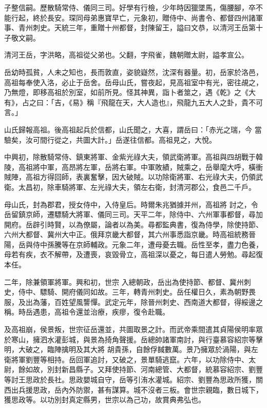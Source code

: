 \begin{pinyinscope}
 子整信嗣。歷散騎常侍、儀同三司。好學有行檢，少年時因獵墜馬，傷腰腳，卒不能行起，終於長安。琛同母弟惠寶早亡，元象初，贈侍中、尚書令、都督四州諸軍事、青州刺史。天統三年，重贈十州都督，封陳留王，謚曰文恭，以清河王岳第十子敬文嗣。



 清河王岳，字洪略，高祖從父弟也。父翻，字飛雀，魏朝贈太尉，謚孝宣公。



 岳幼時孤貧，人未之知也，長而敦直，姿貌嶷然，沈深有器量。初，岳家於洛邑，高祖每奉使入洛，必止于岳舍。岳母山氏，嘗夜起，見高祖室中有光，密往覘之，乃無燈，即移高祖於別室，如前所見。怪其神異，詣卜者筮之，遇《乾》之《大有》，占之曰：「吉，《易》稱『飛龍在天，大人造也』，飛龍九五大人之卦，貴不可言。」



 山氏歸報高祖。後高祖起兵於信都，山氏聞之，大喜，謂岳曰：「赤光之瑞，今
 當驗矣，汝可間行從之，共圖大計。」岳遂往信都。高祖見之，大悅。



 中興初，除散騎常侍、鎮東將軍、金紫光祿大夫，領武衛將軍。高祖與四胡戰于韓陵，高祖將中軍，高昂將左軍，岳將右軍。中軍敗績，賊乘之，岳舉麾大呼，橫衝賊陣，高祖方得回師，表裏奮擊，因大破賊。以功除衛將軍、右光祿大夫，仍領武衛。太昌初，除車騎將軍、左光祿大夫，領左右衛，封清河郡公，食邑二千戶。



 母山氏，封為郡君，授女侍中，入侍皇后。時爾朱兆猶據并州，高祖將
 討之，令岳留鎮京師，遷驃騎大將軍、儀同三司。天平二年，除侍中、六州軍事都督，尋加開府。岳辟引時賢，以為僚屬，論者以為美。尋都監典書，復為侍學，除使持節、六州大都督、冀州大中正。俄拜京畿大都督，其六州事悉詣京畿。時高祖統務晉陽，岳與侍中孫騰等在京師輔政。元象二年，遭母憂去職。岳性至孝，盡力色養，母若有疾，衣不解帶，及遭喪，哀毀骨立，高祖深以憂之，每日遣人勞勉。尋起復本任。



 二年，除兼領軍將軍。興和初，世宗
 入總朝政，岳出為使持節、都督、冀州刺史，侍中、驃騎、開府儀同如故。三年，轉青州刺史。岳任權日久，素為朝野畏服，及出為藩，百姓望風讋憚。武定元年，除晉州刺史、西南道大都督，得綏邊之稱。時岳遇患，高祖令還並治療，疾瘳，復令赴職。



 及高祖崩，侯景叛，世宗征岳還並，共圖取景之計。而武帝乘間遣其貞陽侯明率眾於寒山，擁泗水灌彭城，與景為掎角聲援。岳總帥諸軍南討，與行臺慕容紹宗等擊明，大破之，臨陣擒明及其大將
 胡貴孫，自餘俘馘數萬。景乃擁眾於渦陽，與左衛將軍劉豐等相持。岳回軍追討，又破之，景單騎逃竄。六年，以功除侍中、太尉，餘如故，別封新昌縣子。又拜使持節、河南總管、大都督，統慕容紹宗、劉豐等討王思政於長社。思政嬰城自守，岳等引洧水灌城。紹宗、劉豐為思政所獲，關西出兵援思政，岳內外防禦，甚有謀算。城不沒者三板。會世宗親臨，數日城下，獲思政等。以功別封真定縣男，世宗以為己功，故賞典弗弘也。




\end{pinyinscope}
